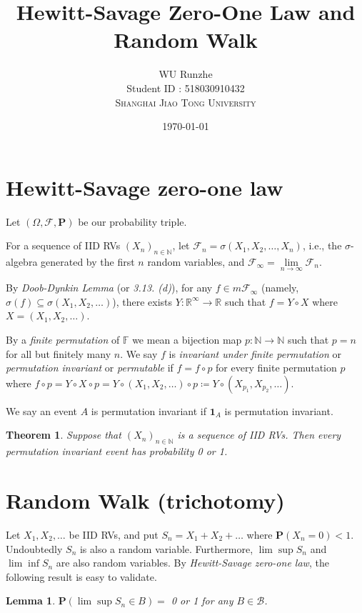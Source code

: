 \documentclass[12pt]{article}
\title{Hewitt-Savage Zero-One Law and Random Walk}
\author{WU Runzhe\\
	Student ID : 518030910432\\
	\textsc{Shanghai Jiao Tong University}}
\date{\today}
\newcommand\bF{\mathbb{F}}
\newcommand\bN{\mathbb{N}}
\newcommand\bR{\mathbb{R}}
\newcommand\cF{\mathcal{F}}
\newcommand\pro{\mathbf{P}}
\newcommand\ce{\coloneqq}
\newcommand{\ind}[1]{\mathbf{1}_{#1}}
\newtheorem{lemma}{Lemma}
\newtheorem{theorem}{Theorem}
\begin{document}
	\maketitle
	
	\section{Hewitt-Savage zero-one law}
	
	Let $(\Omega, \cF, \pro)$ be our probability triple.
	
	For a sequence of IID RVs $(X_n)_{n\in\bN}$, let $\cF_n=\sigma(X_1,X_2,\dots,X_n)$, i.e., the $\sigma$-algebra generated by the first $n$ random variables, and $\cF_\infty=\lim\limits_{n\rightarrow\infty}\cF_n$.
	
	By \textit{Doob-Dynkin Lemma} (or \textit{3.13. (d)}), for any $f\in m\cF_\infty$ (namely, $\sigma(f)\subseteq\sigma(X_1,X_2,\dots)$), there exists $Y:\bR^\infty\rightarrow \bR$ such that $f=Y\circ X$ where $X=(X_1,X_2,\dots)$.
	
	By a \textit{finite permutation} of $\bF$ we mean a bijection map $p:\bN\rightarrow\bN$ such that $p=n$ for all but finitely many $n$. We say $f$ is \textit{invariant under finite permutation} or \textit{permutation invariant} or \textit{permutable} if $f=f\circ p$ for every finite permutation $p$ where $f\circ p=Y\circ X\circ p=Y\circ (X_1,X_2,\dots)\circ p\ce Y\circ (X_{p_1},X_{p_2},\dots)$.
	
	We say an event $A$ is permutation invariant if $\ind{A}$ is permutation invariant.
	
	\begin{theorem}
		Suppose that $(X_n)_{n\in\bN}$ is a sequence of IID RVs. Then every permutation invariant event has probability 0 or 1.
	\end{theorem}
	
	\section{Random Walk (trichotomy)}
	
	Let $X_1,X_2,\dots$ be IID RVs, and put $S_n = X_1 + X_2 + \dots$ where $\pro(X_n=0)<1$. Undoubtedly $S_n$ is also a random variable. Furthermore, $\lim \sup S_n$ and $\lim \inf S_n$ are also random variables. By \textit{Hewitt-Savage zero-one law}, the following result is easy to validate.
	
	\begin{lemma}\label{l1}
		$\pro(\lim\sup S_n\in B)=$ 0 or 1 for any $B\in\mathcal{B}$.
	\end{lemma}
	
\end{document}
